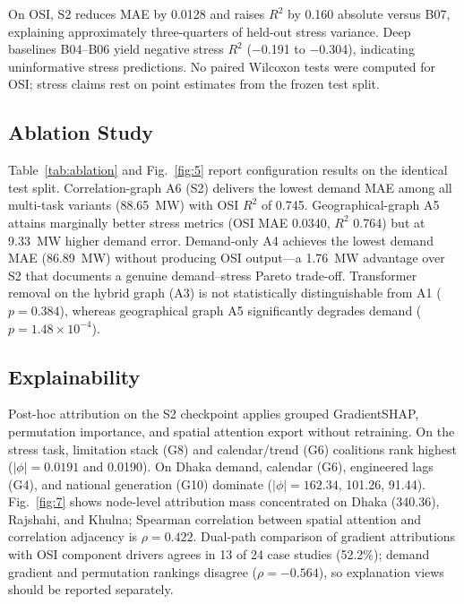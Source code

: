 On OSI, S2 reduces MAE by 0.0128 and raises $R^2$ by 0.160 absolute versus B07, explaining approximately three-quarters of held-out stress variance. Deep baselines B04--B06 yield negative stress $R^2$ ($-$0.191 to $-$0.304), indicating uninformative stress predictions. No paired Wilcoxon tests were computed for OSI; stress claims rest on point estimates from the frozen test split.

\subsection{Ablation Study}

Table~\ref{tab:ablation} and Fig.~\ref{fig:5} report configuration results on the identical test split. Correlation-graph A6 (S2) delivers the lowest demand MAE among all multi-task variants (88.65~MW) with OSI $R^2$ of 0.745. Geographical-graph A5 attains marginally better stress metrics (OSI MAE 0.0340, $R^2$ 0.764) but at 9.33~MW higher demand error. Demand-only A4 achieves the lowest demand MAE (86.89~MW) without producing OSI output---a 1.76~MW advantage over S2 that documents a genuine demand--stress Pareto trade-off. Transformer removal on the hybrid graph (A3) is not statistically distinguishable from A1 ($p{=}0.384$), whereas geographical graph A5 significantly degrades demand ($p{=}1.48{\times}10^{-4}$).




\subsection{Explainability}

Post-hoc attribution \cite{Lundberg2017SHAP,Sundararajan2017IntegratedGradients} on the S2 checkpoint applies grouped GradientSHAP, permutation importance, and spatial attention export without retraining. On the stress task, limitation stack (G8) and calendar/trend (G6) coalitions rank highest ($|\phi|{=}0.0191$ and 0.0190). On Dhaka demand, calendar (G6), engineered lags (G4), and national generation (G10) dominate ($|\phi|{=}162.34$, 101.26, 91.44). Fig.~\ref{fig:7} shows node-level attribution mass concentrated on Dhaka (340.36), Rajshahi, and Khulna; Spearman correlation between spatial attention and correlation adjacency is $\rho{=}0.422$. Dual-path comparison of gradient attributions with OSI component drivers agrees in 13 of 24 case studies (52.2\%); demand gradient and permutation rankings disagree ($\rho{=}{-}0.564$), so explanation views should be reported separately.


